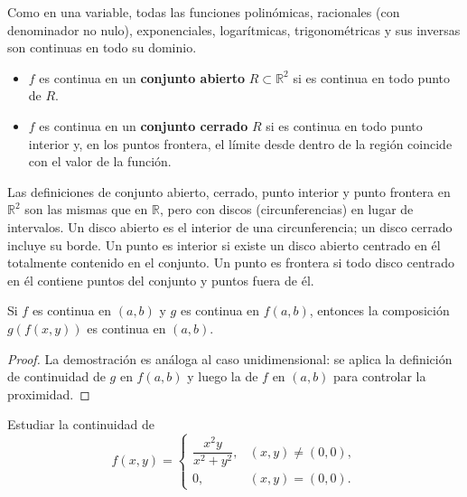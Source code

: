 \begin{rem}
Como en una variable, todas las funciones polinómicas, racionales
(con denominador no nulo), exponenciales, logarítmicas, trigonométricas
y sus inversas son continuas en todo su dominio.
\end{rem}

\begin{definition}
\begin{itemize}
    \item $f$ es continua en un \textbf{conjunto abierto} $R\subset\mathbb{R}^2$
    si es continua en todo punto de $R$.
    \item $f$ es continua en un \textbf{conjunto cerrado} $R$ si es
    continua en todo punto interior y, en los puntos frontera, el
    límite desde dentro de la región coincide con el valor de la
    función.
\end{itemize}
\end{definition}

\begin{rem}
Las definiciones de conjunto abierto, cerrado, punto interior y punto
frontera en $\mathbb{R}^2$ son las mismas que en $\mathbb{R}$, pero
con discos (circunferencias) en lugar de intervalos. Un disco abierto
es el interior de una circunferencia; un disco cerrado incluye su
borde. Un punto es interior si existe un disco abierto centrado en él
totalmente contenido en el conjunto. Un punto es frontera si todo
disco centrado en él contiene puntos del conjunto y puntos fuera de él.
\end{rem}

\begin{theorem}
Si $f$ es continua en $(a,b)$ y $g$ es continua en $f(a,b)$, entonces
la composición $g(f(x,y))$ es continua en $(a,b)$.
\end{theorem}

\begin{proof}
La demostración es análoga al caso unidimensional: se aplica la
definición de continuidad de $g$ en $f(a,b)$ y luego la de $f$ en
$(a,b)$ para controlar la proximidad.
\end{proof}

\begin{example}
Estudiar la continuidad de
\[
f(x,y)=
\begin{cases}
\dfrac{x^2 y}{x^2+y^2}, & (x,y)\neq (0,0),\\[8pt]
0, & (x,y)=(0,0).
\end{cases}
\]
\end{example}

